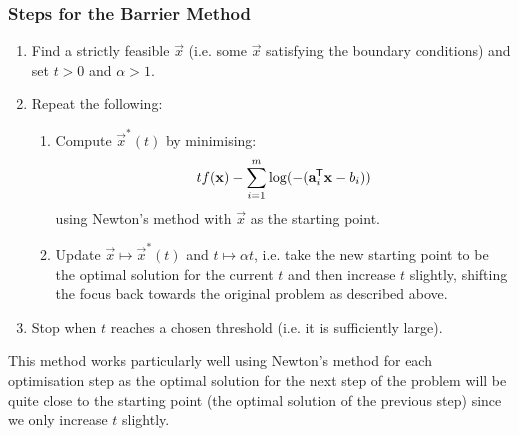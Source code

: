 \documentclass[../main.tex]{subfiles}
\begin{document}
\subsubsection{Steps for the Barrier Method}
\begin{enumerate}
  \item Find a strictly feasible $\vec{x}$ (i.e. some $\vec{x}$ satisfying the boundary conditions) and set $t > 0$ and $\alpha > 1$.
  \item Repeat the following:
    \begin{enumerate}
      \item Compute $\vec{x}^{*}(t)$ by minimising:
        \[
         tf(\mathbf{\bm{x}}) - \sum_{i = 1}^{m} \log(-(\mathbf{\bm{a}}_i^{{\mkern-1.5mu\mathsf{T}}} \mathbf{\bm{x}} - b_i))
        \]
        using Newton's method with $\vec{x}$ as the starting point.
      \item Update $\vec{x} \mapsto \vec{x}^{*}(t)$ and $t \mapsto \alpha t$, i.e. take the new starting point to be the optimal solution for the current $t$ and then increase $t$ slightly, shifting the focus back towards the original problem as described above.
    \end{enumerate}
    \item Stop when $t$ reaches a chosen threshold (i.e. it is sufficiently large).
\end{enumerate}
\begin{remark}[Intuition]
  This method works particularly well using Newton's method for each optimisation step as the optimal solution for the next step of the problem will be quite close to the starting point (the optimal solution of the previous step) since we only increase $t$ slightly.
\end{remark}
\end{document}

